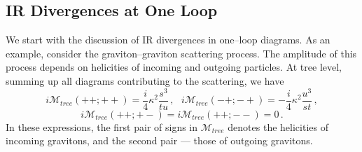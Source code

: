 \documentclass[11pt,a4paper]{article}
\newcommand{\be}{\begin{equation}}
\newcommand{\ee}{\end{equation}}
\newcommand{\M}{\mathcal{M}}
\begin{document}
\subsection{IR Divergences at One Loop}

We start with the discussion of IR divergences in one--loop diagrams. As an example, consider the graviton--graviton scattering process. The amplitude of this process depends on helicities of incoming and outgoing particles. At tree level, summing up all diagrams contributing to the scattering, we have \cite{Grisaru:1979re}
\be
i\M_{\textit{tree}}(++;++)=\dfrac{i}{4}\kappa^2\dfrac{s^3}{tu}\,,~~~i\M_{\textit{tree}}(-+;-+)=-\dfrac{i}{4}\kappa^2\dfrac{u^3}{st}\,,
\ee
\be
i\M_{\textit{tree}}(++;+-)=i\M_{\textit{tree}}(++;--)=0\,.
\ee
In these expressions, the first pair of signs in $\M_{\textit{tree}}$ denotes the helicities of incoming gravitons, and the second pair --- those of outgoing gravitons.
\end{document}
